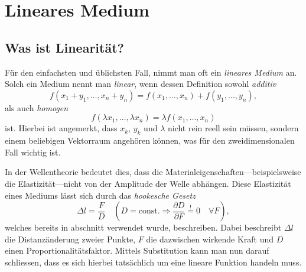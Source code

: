 %
%
%
%
\section{Lineares Medium\label{particles:section:linear}}

\subsection{Was ist Linearität?}
Für den einfachsten und üblichsten Fall, nimmt man oft ein \emph{lineares Medium} an.
Solch ein Medium nennt man \emph{linear}, wenn dessen Definition sowohl \emph{additiv}
\[
    f(x_{1} + y_{1}, \ldots, x_{n} + y_{n}) 
    = 
    f(x_{1}, \ldots, x_{n}) 
    + 
    f(y_{1}, \ldots, y_{n}),
\]
als auch \emph{homogen}
\[
    f(\lambda x_{1}, \ldots, \lambda x_{n}) 
    = 
    \lambda f(x_{1}, \ldots, x_{n})
\]
ist.
Hierbei ist angemerkt, dass $x_{k}$, $y_{k}$ und $\lambda$ nicht rein reell sein müssen, 
sondern einem beliebigen Vektorraum angehören können, 
was für den zweidimensionalen Fall wichtig ist.

In der Wellentheorie bedeutet dies, 
dass die Materialeigenschaften---beispielsweise die Elastizität---nicht von der Amplitude der Welle abhängen.
Diese Elastizität eines Mediums lässt sich durch das \emph{hookesche Gesetz}
\[
    \Delta l
    = 
    \frac{F}{D}
    \quad
    \left(D = \text{const.} 
    \Rightarrow 
    \frac{\partial D}{\partial F} 
    \overset{!}{=} 
    0 
    \quad 
    \forall F \right)
    \label{particles:eq:hookesches-gesetz},
\]
welches bereits in abschnitt  verwendet wurde, beschreiben.
Dabei beschreibt $\Delta l$ die Distanzänderung zweier Punkte,
$F$ die dazwischen wirkende Kraft und $D$ einen Proportionalitätsfaktor.
Mittels Substitution kann man nun darauf schliessen, 
dass es sich hierbei tatsächlich um eine lineare Funktion handeln muss.

